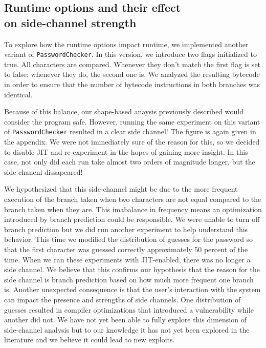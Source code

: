 \subsection{Runtime options and their effect \\on side-channel strength}
To explore how the runtime options impact runtime, we implemented another variant of \texttt{PasswordChecker}. In this version, we introduce two flags initialized to true. All characters are compared. Whenever they don't match the first flag is set to false; whenever they do, the second one is. We analyzed the resulting bytecode in order to ensure that the number of bytecode instructions in both branches was identical. 

Because of this balance, our shape-based anaysis previously described would consider the program safe. However, running the same experiment on this variant of \texttt{PasswordChecker} resulted in a clear side channel! The figure is again given in the appendix. We were not immediately sure of the reason for this, so we decided to disable JIT and re-experiment in the hopes of gaining more insight. In this case, not only did each run take almost two orders of magnitude longer, but the side chanenl dissapeared!

We hypothesized that this side-channel might be due to the more frequent execution of the branch taken when two characters are not equal compared to the branch taken when they are. This imabalance in frequency means an optimization introduced by branch prediction could be responsible. We were unable to turn off branch prediction but we did run another experiment to help understand this behavior. This time we modified the distribution of guesses for the password so that the first character was guessed correctly approximately 50 percent of the time. When we ran these experiments with JIT-enabled, there was no longer a side channel. We believe that this confirms our hypothesis that the reason for the side channel is branch prediction based on how much more frequent one branch is. Another unexpected consequence is that the user's interaction with the system can impact the presence and strengths of side channels. One distribution of guesses resulted in compiler optimizations that introduced a vulnerability while another did not. We have not yet been able to fully explore this dimension of side-channel analysis but to our knowledge it has not yet been explored in the literature and we believe it could lead to new exploits. 
